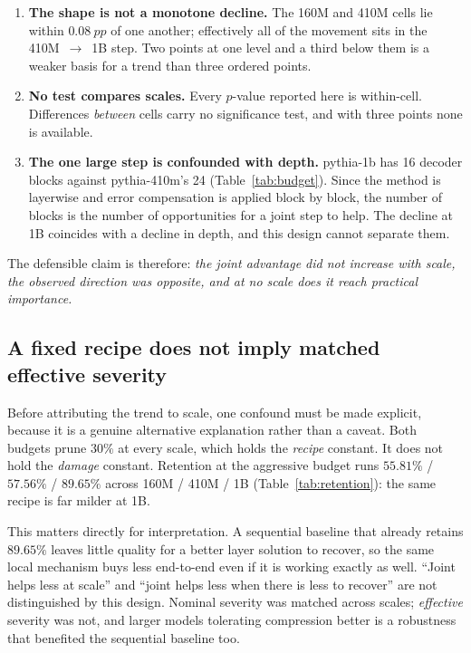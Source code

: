 \begin{enumerate}
  \item \textbf{The shape is not a monotone decline.} The 160M and 410M cells lie within
        $\SI{0.08}{pp}$ of one another; effectively all of the movement sits in the
        410M~$\rightarrow$~1B step. Two points at one level and a third below them is a
        weaker basis for a trend than three ordered points.
  \item \textbf{No test compares scales.} Every $p$-value reported here is within-cell.
        Differences \emph{between} cells carry no significance test, and with three points
        none is available.
  \item \textbf{The one large step is confounded with depth.} pythia-1b has 16 decoder
        blocks against pythia-410m's 24 (Table~\ref{tab:budget}). Since the method is
        layerwise and error compensation is applied block by block, the number of blocks is
        the number of opportunities for a joint step to help. The decline at 1B coincides
        with a decline in depth, and this design cannot separate them.
\end{enumerate}

The defensible claim is therefore: \emph{the joint advantage did not increase with scale, the
observed direction was opposite, and at no scale does it reach practical importance.}

\subsection{A fixed recipe does not imply matched effective severity}
\label{subsec:severity}

Before attributing the trend to scale, one confound must be made explicit, because it is a
genuine alternative explanation rather than a caveat. Both budgets prune $30\%$ at every
scale, which holds the \emph{recipe} constant. It does not hold the \emph{damage} constant.
Retention at the aggressive budget runs $55.81\%$ / $57.56\%$ / $89.65\%$ across
160M / 410M / 1B (Table~\ref{tab:retention}): the same recipe is far milder at 1B.

This matters directly for interpretation. A sequential baseline that already retains $89.65\%$
leaves little quality for a better layer solution to recover, so the same local mechanism buys
less end-to-end even if it is working exactly as well. ``Joint helps less at scale'' and
``joint helps less when there is less to recover'' are not distinguished by this design.
Nominal severity was matched across scales; \emph{effective} severity was not, and larger
models tolerating compression better is a robustness that benefited the sequential baseline
too.

